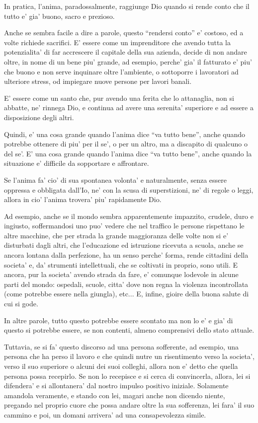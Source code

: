 In pratica, l'anima, paradossalmente, raggiunge Dio quando si rende conto che il tutto e' gia' buono, sacro e prezioso.

Anche se sembra facile a dire a parole, questo ``rendersi conto'' e' costoso, ed a volte richiede sacrifici. E' essere come un imprenditore che avendo tutta la potenzialita' di far accrescere il capitale della sua azienda, decide di non andare oltre, in nome di un bene piu' grande, ad esempio, perche' gia' il fatturato e' piu' che buono e non serve inquinare oltre l'ambiente, o sottoporre i lavoratori ad ulteriore stress, od impiegare nuove persone per lavori banali.

E' essere come un santo che, pur avendo una ferita che lo attanaglia, non si abbatte, ne' rinnega Dio, e continua ad avere una serenita' superiore e ad essere a disposizione degli altri.

Quindi, e' una cosa grande quando l'anima dice ``va tutto bene'', anche quando potrebbe ottenere di piu' per il se', o per un altro, ma a discapito di qualcuno o del se'. E' una cosa grande quando l'anima dice ``va tutto bene'', anche quando la situazione e' difficile da sopportare e affrontare.

Se l'anima fa' cio' di sua spontanea volonta' e naturalmente, senza essere oppressa e obbligata dall'Io, ne' con la scusa di superstizioni, ne' di regole o leggi, allora in cio' l'anima trovera' piu' rapidamente Dio.

Ad esempio, anche se il mondo sembra apparentemente impazzito, crudele, duro e ingiusto, soffermandosi uno puo' vedere che nel traffico le persone rispettano le altre macchine, che per strada la grande maggioranza delle volte non si e' disturbati dagli altri, che l'educazione ed istruzione ricevuta a scuola, anche se ancora lontana dalla perfezione, ha un senso perche' forma, rende cittadini della societa' e, da' strumenti intellettuali, che se coltivati in proprio, sono utili. E ancora, pur la societa' avendo strada da fare, e' comunque lodevole in alcune parti del mondo: ospedali, scuole, citta' dove non regna la violenza incontrollata (come potrebbe essere nella giungla), etc... E, infine, gioire della buona salute di cui si gode.

In altre parole, tutto questo potrebbe essere scontato ma non lo e' e gia' di questo si potrebbe essere, se non contenti, almeno comprensivi dello stato attuale.

Tuttavia, se si fa' questo discorso ad una persona sofferente, ad esempio, una persona che ha perso il lavoro e che quindi nutre un risentimento verso la societa', verso il suo superiore o alcuni dei suoi colleghi, allora non e' detto che quella persona possa recepirlo. Se non lo recepisce e si cerca di convincerla, allora, lei si difendera' e si allontanera' dal nostro impulso positivo iniziale. Solamente amandola veramente, e stando con lei, magari anche non dicendo niente, pregando nel proprio cuore che possa andare oltre la sua sofferenza, lei fara' il suo cammino e poi, un domani arrivera' ad una consapevolezza simile.

